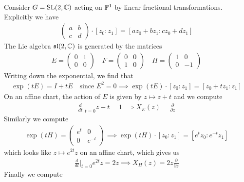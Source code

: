 \begin{example}
    Consider $G = \SL(2,\C)$ acting on $\P^1$ by linear fractional transformations. Explicitly
    we have \begin{align*}
        \begin{pmatrix}
            a & b \\
            c & d
        \end{pmatrix} \cdot [z_0:z_1] = [az_0 + bz_1 : cz_0 + dz_1]
    \end{align*} The Lie algebra $\mf{sl}(2,\C)$ is generated by the matrices \begin{align*}
        E = \begin{pmatrix}
            0 & 1 \\
            0 & 0
        \end{pmatrix} \quad F = \begin{pmatrix}
            0 & 0 \\
            1 & 0
        \end{pmatrix} \quad H = \begin{pmatrix}
            1 & 0 \\
            0 & -1
        \end{pmatrix}
    \end{align*} Writing down the exponential, we find that \begin{align*}
        \exp(tE) = I + tE \quad \text{since } E^2 = 0
        \implies \exp(tE)\cdot [z_0:z_1] = [z_0 + tz_1 : z_1]
    \end{align*} On an affine chart, the action of $E$ is given by $z \mapsto z + t$ and
    we compute \begin{align*}
        \frac{d}{dt}\Big|_{t=0} z + t = 1 \implies X_E(z) = \frac{\partial}{\partial z}
    \end{align*} Similarly we compute \begin{align*}
        \exp(tH) = \begin{pmatrix}
            e^t & 0 \\
            0 & e^{-t}
        \end{pmatrix} \implies \exp(tH)\cdot [z_0:z_1] = [e^tz_0 : e^{-t}z_1]
    \end{align*} which looks like $z\mapsto e^{2t}z$ on an affine chart, which gives us
     \begin{align*}
        \frac{d}{dt}\Big|_{t=0} e^{2t}z = 2z \implies X_H(z) = 2z \frac{\partial}{\partial z}
    \end{align*} Finally we compute \begin{align*}

\end{align*}
\end{example}
